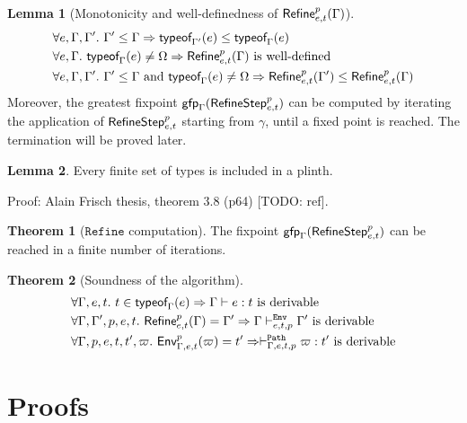 \documentclass[a4paper]{article}
\theoremstyle{definition}
\newtheorem{theorem}{Theorem}
\newtheorem{lemma}{Lemma}
\begin{document}
  \begin{lemma}[Monotonicity and well-definedness of $\Refine p {e,t} \Gamma$]
    \begin{align*}
      &\forall e,\Gamma,\Gamma'.\ \Gamma'\leq\Gamma \Rightarrow \tyof e {\Gamma'} \leq \tyof e {\Gamma}\\
      &\forall e,\Gamma.\ \tyof e \Gamma \neq \tsempty \Rightarrow \Refine p {e,t} \Gamma \text{ is well-defined}\\
      &\forall e,\Gamma,\Gamma'.\ \Gamma'\leq\Gamma \text{ and } \tyof e \Gamma \neq \tsempty \Rightarrow \Refine p {e,t} {\Gamma'} \leq \Refine p {e,t} \Gamma\\
    \end{align*}
  Moreover, the greatest fixpoint $\fixpoint_\Gamma (\RefineStep p {e,t})$ can be computed by iterating
  the application of $\RefineStep p {e,t}$ starting from $\gamma$, until a fixed point is reached.
  The termination will be proved later.
  \end{lemma}

  \begin{lemma}
    Every finite set of types is included in a plinth.
  \end{lemma}
  Proof: Alain Frisch thesis, theorem 3.8 (p64) [TODO: ref].

  \begin{theorem}[$\texttt{Refine}$ computation]
    The fixpoint $\fixpoint_\Gamma (\RefineStep p {e,t})$ can be reached in a finite number of iterations.
  \end{theorem}

  \begin{theorem}[Soundness of the algorithm]
    \begin{align*}
      &\forall \Gamma, e, t.\ t\in\tyof e \Gamma \Rightarrow \Gamma \vdash e:t\text{ is derivable}\\
      &\forall \Gamma, \Gamma', p, e, t.\ \Refine p {e,t} \Gamma = \Gamma' \Rightarrow \Gamma \evdash p e t \Gamma' \text{ is derivable}\\
      &\forall \Gamma, p, e, t, t', \varpi.\ \Gp p {\Gamma,e,t} (\varpi) = t' \Rightarrow \pvdash \Gamma p e t \varpi:t' \text{ is derivable}
    \end{align*}
  \end{theorem}

  \section{Proofs}
\end{document}
